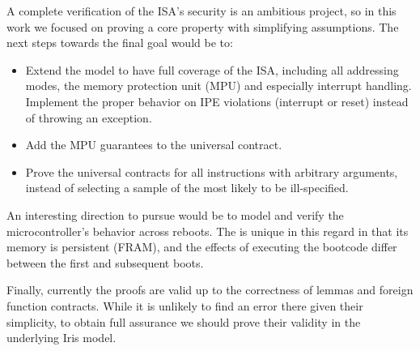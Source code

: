 A complete verification of the \msp ISA's security is an ambitious project, so in this work we focused on proving a core property with simplifying assumptions. The next steps towards the final goal would be to:
\begin{itemize}
\item Extend the model to have full coverage of the \msp ISA, including all addressing modes, the memory protection unit (MPU) and especially interrupt handling. Implement the proper behavior on IPE violations (interrupt or reset) instead of throwing an exception.
\item Add the MPU guarantees to the universal contract.
\item Prove the universal contracts for all instructions with arbitrary arguments, instead of selecting a sample of the most likely to be ill-specified.
\end{itemize}

An interesting direction to pursue would be to model and verify the microcontroller's behavior across reboots. The \msp is unique in this regard in that its memory is persistent (FRAM), and the effects of executing the bootcode differ between the first and subsequent boots.

Finally, currently the proofs are valid up to the correctness of lemmas and foreign function contracts. While it is unlikely to find an error there given their simplicity, to obtain full assurance we should prove their validity in the underlying Iris model. %




